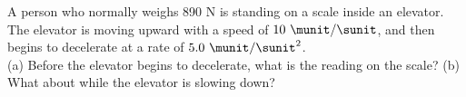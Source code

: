 A person who normally weighs 890 N is standing on a scale inside
an elevator. The elevator is moving upward with a speed of $10\ \munit/\sunit$,
and then begins to decelerate at a rate of $5.0\ \munit/\sunit^2$.\\
%
(a) Before the elevator begins to decelerate, what is the reading on the scale?\answercheck\hwendpart
%
(b) What about while the elevator is slowing down?\answercheck
